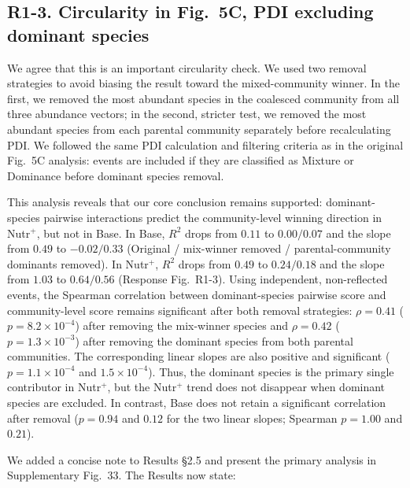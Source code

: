 \subsection*{R1-3. Circularity in Fig.~5C, PDI excluding dominant species}


\responselabel
We agree that this is an important circularity check. We used two removal strategies to avoid biasing the result toward the mixed-community winner. In the first, we removed the most abundant species in the coalesced community from all three abundance vectors; in the second, stricter test, we removed the most abundant species from each parental community separately before recalculating PDI. We followed the same PDI calculation and filtering criteria as in the original Fig.~5C analysis: events are included if they are classified as Mixture or Dominance before dominant species removal.

This analysis reveals that our core conclusion remains supported: dominant-species pairwise interactions predict the community-level winning direction in Nutr$^+$, but not in Base. In Base, $R^2$ drops from $0.11$ to $0.00 / 0.07$ and the slope from $0.49$ to $-0.02 / 0.33$ (Original / mix-winner removed / parental-community dominants removed). In Nutr$^+$, $R^2$ drops from $0.49$ to $0.24 / 0.18$ and the slope from $1.03$ to $0.64 / 0.56$ (Response Fig.~R1-3). Using independent, non-reflected events, the Spearman correlation between dominant-species pairwise score and community-level score remains significant after both removal strategies: $\rho = 0.41$ ($p = 8.2 \times 10^{-4}$) after removing the mix-winner species and $\rho = 0.42$ ($p = 1.3 \times 10^{-3}$) after removing the dominant species from both parental communities. The corresponding linear slopes are also positive and significant ($p = 1.1 \times 10^{-4}$ and $1.5 \times 10^{-4}$). Thus, the dominant species is the primary single contributor in Nutr$^+$, but the Nutr$^+$ trend does not disappear when dominant species are excluded. In contrast, Base does not retain a significant correlation after removal ($p = 0.94$ and $0.12$ for the two linear slopes; Spearman $p = 1.00$ and $0.21$).

We added a concise note to Results \S2.5 and present the primary analysis in Supplementary Fig.~33. The Results now state: 

